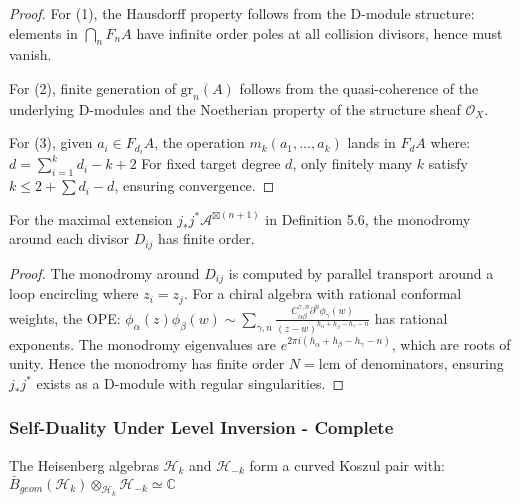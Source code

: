 \begin{proof}
For (1), the Hausdorff property follows from the D-module structure: elements in $\bigcap_n F_nA$ have infinite order poles at all collision divisors, hence must vanish.

For (2), finite generation of $\text{gr}_n(A)$ follows from the quasi-coherence of the underlying D-modules and the Noetherian property of the structure sheaf $\mathcal{O}_X$.

For (3), given $a_i \in F_{d_i}A$, the operation $m_k(a_1, \ldots, a_k)$ lands in $F_d A$ where:
$d = \sum_{i=1}^k d_i - k + 2$
For fixed target degree $d$, only finitely many $k$ satisfy $k \leq 2 + \sum d_i - d$, ensuring convergence.
\end{proof}

\begin{theorem}\label{thm:monodromy-finite}
For the maximal extension $j_*j^*\mathcal{A}^{\boxtimes(n+1)}$ in Definition 5.6, the monodromy around each divisor $D_{ij}$ has finite order.
\end{theorem}

\begin{proof}
The monodromy around $D_{ij}$ is computed by parallel transport around a loop encircling where $z_i = z_j$. For a chiral algebra with rational conformal weights, the OPE:
$\phi_\alpha(z)\phi_\beta(w) \sim \sum_{\gamma,n} \frac{C^{\gamma,n}_{\alpha\beta}\partial^n\phi_\gamma(w)}{(z-w)^{h_\alpha + h_\beta - h_\gamma - n}}$
has rational exponents. The monodromy eigenvalues are $e^{2\pi i(h_\alpha + h_\beta - h_\gamma - n)}$, which are roots of unity. Hence the monodromy has finite order $N = \text{lcm}$ of denominators, ensuring $j_*j^*$ exists as a D-module with regular singularities.
\end{proof}

\subsubsection{Self-Duality Under Level Inversion - Complete}

\begin{theorem}
The Heisenberg algebras $\mathcal{H}_k$ and $\mathcal{H}_{-k}$ form a curved Koszul pair with:
$\bar{B}_{geom}(\mathcal{H}_k) \otimes_{\mathcal{H}_k} \mathcal{H}_{-k} \simeq \mathbb{C}$
\end{theorem}

